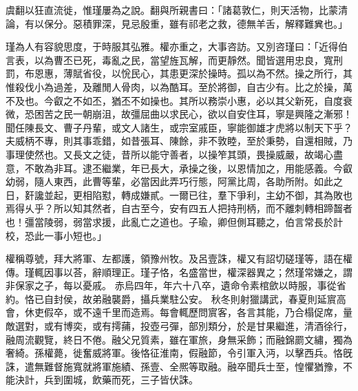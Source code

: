 \begin{pinyinscope}
 
 
 
 虞翻以狂直流徙，惟瑾屢為之說。翻與所親書曰：「諸葛敦仁，則天活物，比蒙清論，有以保分。惡積罪深，見忌殷重，雖有祁老之救，德無羊舌，解釋難兾也。」
 
 
瑾為人有容貌思度，于時服其弘雅。權亦重之，大事咨訪。又別咨瑾曰：「近得伯言表，以為曹丕已死，毒亂之民，當望旌瓦解，而更靜然。聞皆選用忠良，寬刑罰，布恩惠，薄賦省役，以恱民心，其患更深於操時。孤以為不然。操之所行，其惟殺伐小為過差，及離閒人骨肉，以為酷耳。至於將御，自古少有。比之於操，萬不及也。今叡之不如丕，猶丕不如操也。其所以務崇小惠，必以其父新死，自度衰微，恐困苦之民一朝崩沮，故彊屈曲以求民心，欲以自安住耳，寧是興隆之漸邪！聞任陳長文、曹子丹輩，或文人諸生，或宗室戚臣，寧能御雄才虎將以制天下乎？夫威柄不專，則其事乖錯，如昔張耳、陳餘，非不敦睦，至於秉勢，自還相賊，乃事理使然也。又長文之徒，昔所以能守善者，以操笮其頭，畏操威嚴，故竭心盡意，不敢為非耳。逮丕繼業，年已長大，承操之後，以恩情加之，用能感義。今叡幼弱，隨人東西，此曹等輩，必當因此弄巧行態，阿黨比周，各助所附。如此之日，姧讒並起，更相陷懟，轉成嫌貳。一爾已往，羣下爭利，主幼不御，其為敗也焉得乆乎？所以知其然者，自古至今，安有四五人把持刑柄，而不離刺轉相蹄齧者也！彊當陵弱，弱當求援，此亂亡之道也。子瑜，卿但側耳聽之，伯言常長於計校，恐此一事小短也。」
 
 
權稱尊號，拜大將軍、左都護，領豫州牧。及呂壹誅，權又有詔切磋瑾等，語在權傳。瑾輒因事以荅，辭順理正。瑾子恪，名盛當世，權深器異之；然瑾常嫌之，謂非保家之子，每以憂戚。
 赤烏四年，年六十八卒，遺命令素棺歛以時服，事從省約。恪已自封侯，故弟融襲爵，攝兵業駐公安。
 秋冬則射獵講武，春夏則延賔高會，休吏假卒，或不遠千里而造焉。每會輒歷問賔客，各言其能，乃合榻促席，量敵選對，或有博奕，或有摴蒱，投壺弓彈，部別類分，於是甘果繼進，清酒徐行，融周流觀覽，終日不倦。融父兄質素，雖在軍旅，身無采飾；而融錦罽文繡，獨為奢綺。孫權薨，徙奮威將軍。後恪征淮南，假融節，令引軍入沔，以擊西兵。恪旣誅，遣無難督施寬就將軍施績、孫壹、全熈等取融。融卒聞兵士至，惶懼猶豫，不能決計，兵到圍城，飲藥而死，三子皆伏誅。
 
 
\end{pinyinscope}
